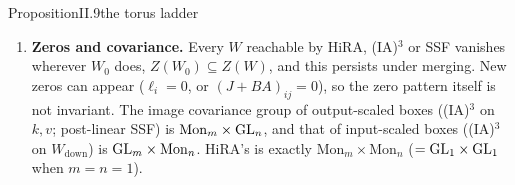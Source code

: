 \begin{restate}{Proposition}{II.9}{the torus ladder}
\begin{enumerate}[label=(\alph*)]
    scaled rotations $\alpha_i\mathrm{Rot}(\theta_i)$ of output pairs. It is the left action of
    $\CO^+(2)^{m/2}\cong(\mathbb C^\times)^{m/2}$: it is \textbf{(IA)$^{\mathbf 3}$ over $\mathbb C$}. It multiplies the
    input Gram matrix of each output pair by $\alpha_i^2$. Since $\alpha_i$ may be $0$, its image is the orbit closure,
    a real-linear space of dimension exactly $m$ whenever no output-pair block of $W_0$ is zero. RoAd$_2$ and RoAd$_4$
    (HF \texttt{road\_2}, \texttt{road\_4}) let each block range over all of $M_2(\R)$. They realise the block-diagonal
    action of the monoid $M_2(\R)^{m/2}$ (its group part $\GL_2^{m/2}$ is non-abelian), with linear image
    $\{\mathrm{blockdiag}(R_i)W_0\}$ of dimension $2m$ when every pair block has rank $2$. For them the Gram statement
    and ``over $\mathbb C$'' fail, and RoAd$_4$ carries a positive-dimensional gauge (two dimensions per row). HF pairs
    output $j$ with $j+g/2$ inside each group of size $g$ (default $64$) rather than adjacent outputs as in the paper,
    and also rotates the bias; the statements above do not depend on the pairing.
  \item \textbf{Zeros and covariance.} Every $W$ reachable by HiRA, (IA)$^3$ or SSF vanishes wherever $W_0$ does,
    $Z(W_0)\subseteq Z(W)$, and this persists under merging. New zeros can appear ($\ell_i=0$, or $(J+BA)_{ij}=0$), so
    the zero pattern itself is not invariant. The image covariance group of output-scaled boxes ((IA)$^3$ on $k,v$;
    post-linear SSF) is $\mathrm{Mon}_m\times\mathrm{GL}_n$, and that of input-scaled boxes ((IA)$^3$ on $W_{\mathrm{down}}$) is
    $\mathrm{GL}_m\times\mathrm{Mon}_n$. HiRA's is exactly $\mathrm{Mon}_m\times\mathrm{Mon}_n$ ($=\mathrm{GL}_1\times\mathrm{GL}_1$ when
    $m=n=1$).
\end{enumerate}
\end{restate}

